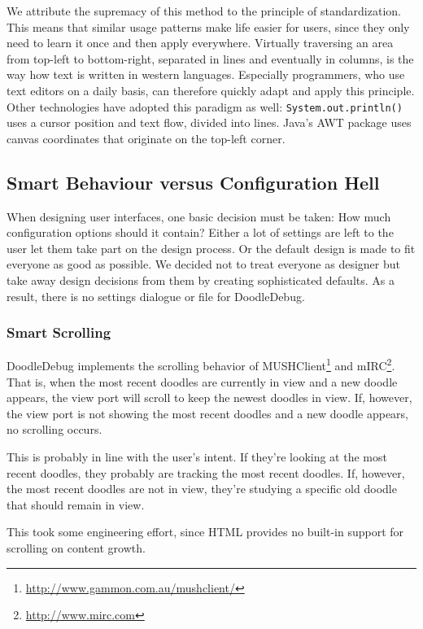 \documentclass[english]{acm_proc_article-sp}
\newcommand\nes[1]{\nbc{nes}{#1}{blue}}
\begin{document}
We attribute the supremacy of this method to the principle of standardization\cite[pp. 
200--203]{Norm88a}. 
This means that similar usage patterns make life easier for users, since they only need to learn it once and then apply everywhere. 
Virtually traversing an area from top-left to bottom-right, separated in lines and eventually in columns, is the way how text is written in western languages. 
Especially programmers, who use text editors on a daily basis, can therefore quickly adapt and apply this principle. 
Other technologies have adopted this paradigm as well: \verb-System.out.println()- uses a cursor position and text flow, divided into lines. 
Java's AWT package uses canvas coordinates that originate on the top-left corner.

\subsection{Smart Behaviour versus Configuration Hell}
When designing user interfaces, one basic decision must be taken: How much configuration options should it contain? Either a lot of settings are left to the user let them take part on the design process. 
Or the default design is made to fit everyone as good as possible. 
We decided not to treat everyone as designer
\cite[pp95ff]{Buxt07a}
\cite[p155]{Norm88a}
but take away design decisions from them by creating sophisticated defaults.
As a result, there is no settings dialogue or file for DoodleDebug. 
\nes{Nice!}
\subsubsection{Smart Scrolling}
DoodleDebug implements the scrolling behavior of MUSHClient\footnote{\url{http://www.gammon.com.au/mushclient/}} and mIRC\footnote{\url{http://www.mirc.com}}. 
That is, when the most recent doodles are currently in view and a new doodle appears, the view port will scroll to keep the newest doodles in view. 
If, however, the view port is not showing the most recent doodles and a new doodle appears, no scrolling occurs. 

This is probably in line with the user's intent. 
If they're looking at the most recent doodles, they probably are tracking the most recent doodles. 
If, however, the most recent doodles are not in view, they're studying a specific old doodle that should remain in view. 

This took some engineering effort, since HTML provides no built-in support for scrolling on content growth.
\end{document}
